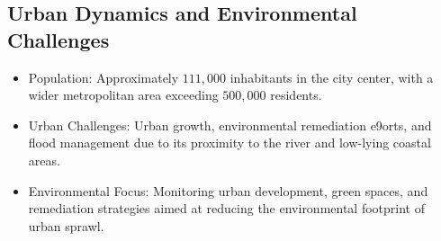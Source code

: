 \documentclass[usenatbib]{tjaa}
\begin{document}
\subsection{Urban Dynamics and Environmental Challenges}
\begin{itemize}
  \item Population: Approximately $111,000$ inhabitants in the city center, with a wider metropolitan
  area exceeding $500,000$ residents.
  \item Urban Challenges: Urban growth, environmental remediation e9orts, and flood management
  due to its proximity to the river and low-lying coastal areas.
  \item Environmental Focus: Monitoring urban development, green spaces, and remediation
  strategies aimed at reducing the environmental footprint of urban sprawl. 
\end{itemize}




\label{lastpage}
\end{document}
